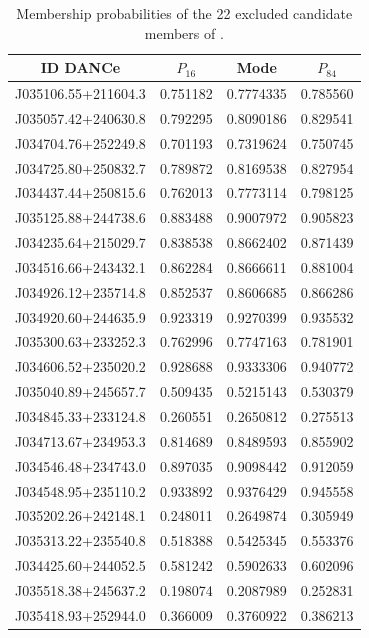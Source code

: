 \begin{table}[htdp]
\caption{Membership probabilities of the 22 excluded candidate members of \citet{Bouy2015}.}
\begin{center}
\begin{tabular}{|c|c|c|c|}
\hline
ID DANCe & $P_{16}$ & Mode & $P_{84}$\\
\hline
\hline
J035106.55+211604.3 &0.751182& 0.7774335&    0.785560\\
J035057.42+240630.8 &0.792295& 0.8090186&   0.829541 \\
J034704.76+252249.8& 0.701193& 0.7319624 &   0.750745\\
J034725.80+250832.7 &0.789872& 0.8169538 &  0.827954 \\
J034437.44+250815.6 &0.762013& 0.7773114 &   0.798125\\
J035125.88+244738.6& 0.883488& 0.9007972 &  0.905823 \\
J034235.64+215029.7 &0.838538& 0.8662402 &  0.871439 \\
J034516.66+243432.1 &0.862284& 0.8666611 &   0.881004\\
J034926.12+235714.8& 0.852537& 0.8606685 &  0.866286 \\
J034920.60+244635.9 &0.923319& 0.9270399 &  0.935532 \\
J035300.63+233252.3 &0.762996& 0.7747163 &  0.781901 \\
J034606.52+235020.2& 0.928688& 0.9333306 &  0.940772 \\
J035040.89+245657.7 &0.509435& 0.5215143 &  0.530379 \\
J034845.33+233124.8 &0.260551& 0.2650812 &  0.275513 \\
J034713.67+234953.3& 0.814689& 0.8489593 &  0.855902 \\
J034546.48+234743.0 &0.897035& 0.9098442 &  0.912059 \\
J034548.95+235110.2 &0.933892& 0.9376429 &   0.945558\\
J035202.26+242148.1& 0.248011& 0.2649874 &   0.305949\\
J035313.22+235540.8 &0.518388& 0.5425345 &  0.553376 \\
J034425.60+244052.5 &0.581242& 0.5902633 &  0.602096 \\
J035518.38+245637.2& 0.198074& 0.2087989 &  0.252831 \\
J035418.93+252944.0& 0.366009& 0.3760922 &  0.386213 \\
\hline
\end{tabular}
\end{center}
\label{tab:22excluded}
\end{table}%


